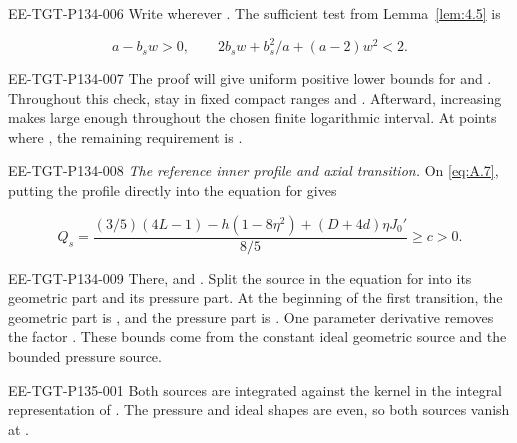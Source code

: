 \begin{EESegment}{EE-TGT-P134-006}
Write  wherever . The sufficient test from
Lemma~\ref{lem:4.5} is
\end{EESegment}
\begin{equation}
 a-b_sw>0,\qquad 2b_sw+b_s^2/a+(a-2)w^2<2.
 \tag{A.24}\label{eq:A.24}
\end{equation}
\begin{EESegment}{EE-TGT-P134-007}
The proof will give uniform positive lower bounds for  and
. Throughout this check,
 stay in fixed compact ranges and . Afterward, increasing
 makes  large enough throughout the chosen finite
logarithmic interval. At points where , the remaining requirement is
.
\end{EESegment}

\begin{EESegment}{EE-TGT-P134-008}
\emph{The reference inner profile and axial transition.} On \eqref{eq:A.7}, putting the profile directly into the
equation for  gives
\end{EESegment}
\begin{equation}
 Q_s=\frac{(3/5)(4L-1)-h(1-8\eta^2)+(D+4d)\eta J_0'}{8/5}\geq c>0.
 \tag{A.25}\label{eq:A.25}
\end{equation}
\begin{EESegment}{EE-TGT-P134-009}
There,  and . Split the source in the equation for
 into its geometric part and its pressure part. At the beginning of the first transition, the
geometric part is , and the pressure part is
. One parameter
derivative removes the factor . These bounds come from the constant ideal geometric source
and the bounded pressure source.
\end{EESegment}
%
\begin{EESegment}{EE-TGT-P135-001}
Both sources are integrated against the kernel in the integral representation of . The
pressure and ideal shapes are even, so both sources vanish at .
\end{EESegment}

